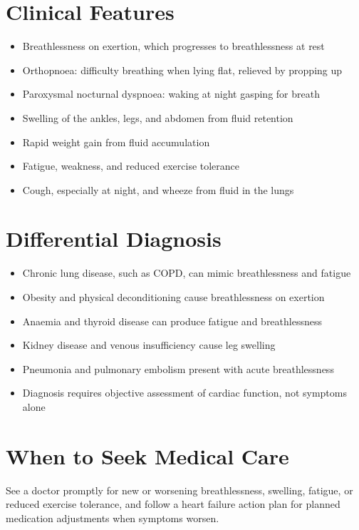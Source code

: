 \section*{Clinical Features}
\begin{itemize}
    \item Breathlessness on exertion, which progresses to breathlessness at rest
    \item Orthopnoea: difficulty breathing when lying flat, relieved by propping up
    \item Paroxysmal nocturnal dyspnoea: waking at night gasping for breath
    \item Swelling of the ankles, legs, and abdomen from fluid retention
    \item Rapid weight gain from fluid accumulation
    \item Fatigue, weakness, and reduced exercise tolerance
    \item Cough, especially at night, and wheeze from fluid in the lungs
\end{itemize}

\section*{Differential Diagnosis}
\begin{itemize}
    \item Chronic lung disease, such as COPD, can mimic breathlessness and fatigue
    \item Obesity and physical deconditioning cause breathlessness on exertion
    \item Anaemia and thyroid disease can produce fatigue and breathlessness
    \item Kidney disease and venous insufficiency cause leg swelling
    \item Pneumonia and pulmonary embolism present with acute breathlessness
    \item Diagnosis requires objective assessment of cardiac function, not symptoms alone
\end{itemize}

\section*{When to Seek Medical Care}
See a doctor promptly for new or worsening breathlessness, swelling, fatigue, or reduced exercise tolerance, and follow a heart failure action plan for planned medication adjustments when symptoms worsen.

